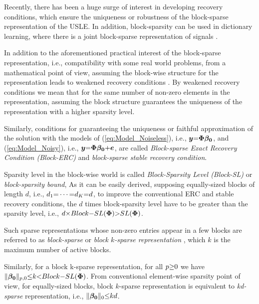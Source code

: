 Recently, there has been a huge surge of interest in developing recovery conditions, which ensure the uniqueness or robustness of the block-sparse representation of the USLE.
In addition, block-sparsity can be used in dictionary learning, where there is a joint block-sparse representation of signals \cite{Zelnik-Manor2012}.

In addition to the aforementioned practical interest of the block-sparse representation, i.e., compatibility with some real world problems, from a mathematical point of view, assuming the block-wise structure for the representation leads to weakened recovery conditions \cite{Eldar2010,Ziaei2010,Ben-Haim2011}.
By weakened recovery conditions we mean that for the same number of non-zero elements in the representation, assuming the block structure guarantees the uniqueness of the representation with a higher sparsity level.

Similarly, conditions for guaranteeing the uniqueness or faithful approximation of the solution with the models of (\ref{eq:Model_Noiseless}), i.e., $\boldsymbol{y} {=} \boldsymbol{\Phi} \boldsymbol{\beta_0}$, and (\ref{eq:Model_Noisy}), i.e., $\boldsymbol{y} {=} \boldsymbol{\Phi} \boldsymbol{\beta_0} {+} \boldsymbol{e}$, are called \emph{Block-sparse Exact Recovery Condition (Block-ERC)} and \emph{block-sparse stable recovery condition}.

{
\label{txt:BlockSL} 
Sparsity level in the block-wise world is called \emph{Block-Sparsity Level (Block-SL)} or \emph{block-sparsity bound}, 
As it can be easily derived, supposing equally-sized blocks of length $d$, i.e., $d_1 {=} \cdots {=} d_K {=} d$, to improve the conventional ERC and stable recovery conditions, the $d$ times block-sparsity level have to be greater than the sparsity level, i.e., $d {\times} Block{-}SL(\boldsymbol{\Phi}) {>} SL(\boldsymbol{\Phi})$.%
}

Such sparse representations whose non-zero entries appear in a few blocks are referred to as \emph{block-sparse} or \emph{block $k$-sparse representation} \cite{Eldar2009b,Stojnic2009a,Ben-Haim2011,Elhamifar2012b}
, which $k$ is the maximum number of active blocks.

Similarly, for a block k-sparse representation, for all $p {\geq} 0$ we have $\Vert \boldsymbol{\beta_0} \Vert_{p,0} {\leq} k {<} Block{-}SL(\boldsymbol{\Phi})$.
From conventional element-wise sparsity point of view, for equally-sized blocks, block $k$-sparse representation is equivalent to \emph{kd-sparse} representation, i.e., $\Vert \boldsymbol{\beta_0} \Vert_{0} {\leq} kd$.

